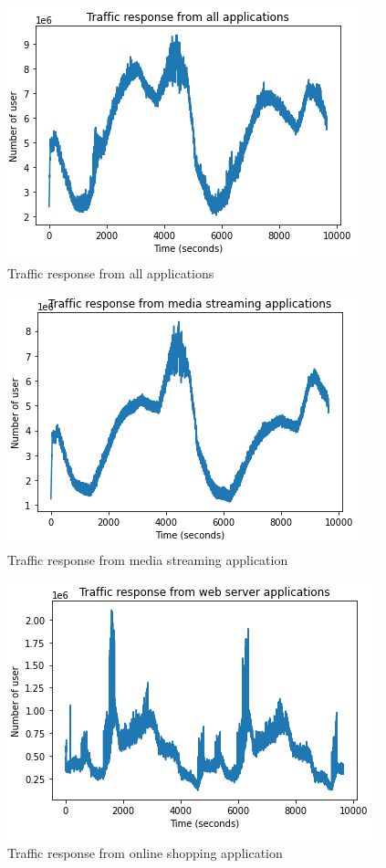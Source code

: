 \documentclass[conference]{IEEEtran}
\begin{document}
\begin{figure}[]
    \centering
        \includegraphics[scale = 0.8]{imgs/agrregated_traffic_all_apps.png}
        \caption{Traffic response from all applications}
        \label{fig:all_app_resp}
    \end{figure}

\begin{figure}[]
    \centering
        \includegraphics[scale = 0.8]{imgs/media_streaming_response_24_02.png}
        \caption{Traffic response from media streaming application}
        \label{fig:media_resp}
    \end{figure}

\begin{figure}[]
    \centering
        \includegraphics[scale = 0.8]{imgs/online_shopping_response.png}
        \caption{Traffic response from online shopping application}
        \label{fig:shopping_resp}
    \end{figure}
\end{document}
